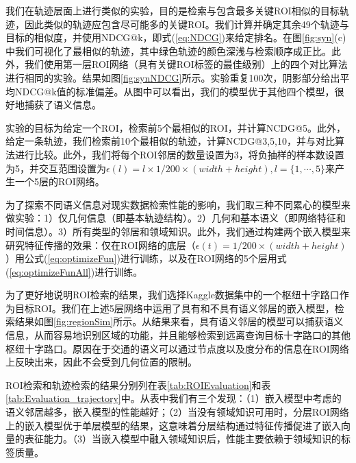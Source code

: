 我们在轨迹层面上进行类似的实验，目的是检索与包含最多关键ROI相似的目标轨迹，因此类似的轨迹应包含尽可能多的关键ROI。我们计算并确定其余49个轨迹与目标的相似度，并使用NDCG@k，即式(\ref{eq:NDCG})来给定排名。在图\ref{fig:syn}(c)中我们可视化了最相似的轨迹，其中绿色轨迹的颜色深浅与检索顺序成正比。此外，我们使用第一层ROI网络（具有关键ROI标签的最佳级别）上的四个对比算法进行相同的实验。结果如图\ref{fig:synNDCG}所示。实验重复100次，阴影部分给出平均NDCG@k值的标准偏差。从图中可以看出，我们的模型优于其他四个模型，很好地捕获了语义信息。





实验的目标为给定一个ROI，检索前5个最相似的ROI，并计算NCDG@5。此外，给定一条轨迹，我们检索前10个最相似的轨迹，计算NCDG@3,5,10，并与对比算法进行比较。此外，我们将每个ROI邻居的数量设置为3，将负抽样的样本数设置为5，并交互范围设置为$\epsilon(l) = l \times 1/200\times(width + height), l = \{1,\cdots,5\}$来产生一个5层的ROI网络。

为了探索不同语义信息对现实数据检索性能的影响，我们取三种不同累心的模型来做实验：1）仅几何信息（即基本轨迹结构）。2）几何和基本语义（即网络特征和时间信息）。3）所有类型的邻居和领域知识。此外，我们通过构建两个嵌入模型来研究特征传播的效果：仅在ROI网络的底层（$\epsilon(t) = 1/200 \times(width + height)$）用公式(\ref{eq:optimizeFun})进行训练，以及在ROI网络的5个层用式(\ref{eq:optimizeFunAll})进行训练。

为了更好地说明ROI检索的结果，我们选择Kaggle数据集中的一个枢纽十字路口作为目标ROI。我们在上述5层网络中运用了具有和不具有语义邻居的嵌入模型，检索结果如图\ref{fig:regionSim}所示。从结果来看，具有语义邻居的模型可以捕获语义信息，从而容易地识别区域的功能，并且能够检索到远离查询目标十字路口的其他枢纽十字路口。原因在于交通的语义可以通过节点度以及度分布的信息在ROI网络上反映出来，因此不会受到几何位置的限制。

ROI检索和轨迹检索的结果分别列在表\ref{tab:ROIEvaluation}和表\ref{tab:Evaluation_trajectory}中。从表中我们有三个发现：（1）嵌入模型中考虑的语义邻居越多，嵌入模型的性能越好；（2）当没有领域知识可用时，分层ROI网络上的嵌入模型优于单层模型的结果，这意味着分层结构通过特征传播促进了嵌入向量的表征能力。（3）当嵌入模型中融入领域知识后，性能主要依赖于领域知识的标签质量。


